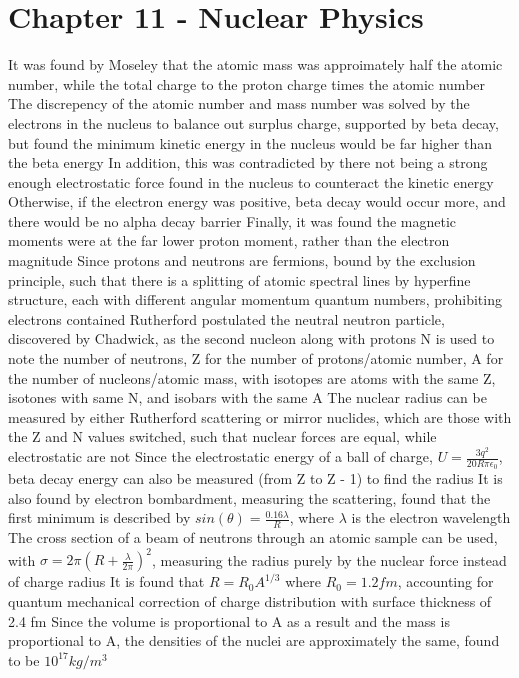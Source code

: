 \documentclass[11 pt, twoside]{article}
\newenvironment{outline*}
{
	\begin{outline}[enumerate]
	}
	{\end{outline}
}
\begin{document}
\section{Chapter 11 - Nuclear Physics}
\begin{outline*}
\1 It was found by Moseley that the atomic mass was approimately half the atomic number, while the total charge to the proton charge times the atomic number
	\2 The discrepency of the atomic number and mass number was solved by the electrons in the nucleus to balance out surplus charge, supported by beta decay, but found the minimum kinetic energy in the nucleus would be far higher than the beta energy
		\3 In addition, this was contradicted by there not being a strong enough electrostatic force found in the nucleus to counteract the kinetic energy
		\3 Otherwise, if the electron energy was positive, beta decay would occur more, and there would be no alpha decay barrier
		\3 Finally, it was found the magnetic moments were at the far lower proton moment, rather than the electron magnitude
	\2 Since protons and neutrons are fermions, bound by the exclusion principle, such that there is a splitting of atomic spectral lines by hyperfine structure, each with different angular momentum quantum numbers, prohibiting electrons contained
	\2 Rutherford postulated the neutral neutron particle, discovered by Chadwick, as the second nucleon along with protons
\1 N is used to note the number of neutrons, Z for the number of protons/atomic number, A for the number of nucleons/atomic mass, with isotopes are atoms with the same Z, isotones with same N, and isobars with the same A
\1 The nuclear radius can be measured by either Rutherford scattering or mirror nuclides, which are those with the Z and N values switched, such that nuclear forces are equal, while electrostatic are not
	\2 Since the electrostatic energy of a ball of charge, $U = \frac{3q^2}{20R\pi\epsilon_0}$, beta decay energy can also be measured (from Z to Z - 1) to find the radius
		\3 It is also found by electron bombardment, measuring the scattering, found that the first minimum is described by $sin(\theta) = \frac{0.16 \lambda}{R}$, where $\lambda$ is the electron wavelength
		\3 The cross section of a beam of neutrons through an atomic sample can be used, with $\sigma = 2\pi(R + \frac{\lambda}{2\pi})^2$, measuring the radius purely by the nuclear force instead of charge radius
	\2 It is found that $R = R_0 A^{1/3}$ where $R_0 = 1.2 fm$, accounting for quantum mechanical correction of charge distribution with surface thickness of 2.4 fm
		\3 Since the volume is proportional to A as a result and the mass is proportional to A, the densities of the nuclei are approximately the same, found to be $10^{17} kg/m^3$

\end{outline*}
\end{document}

